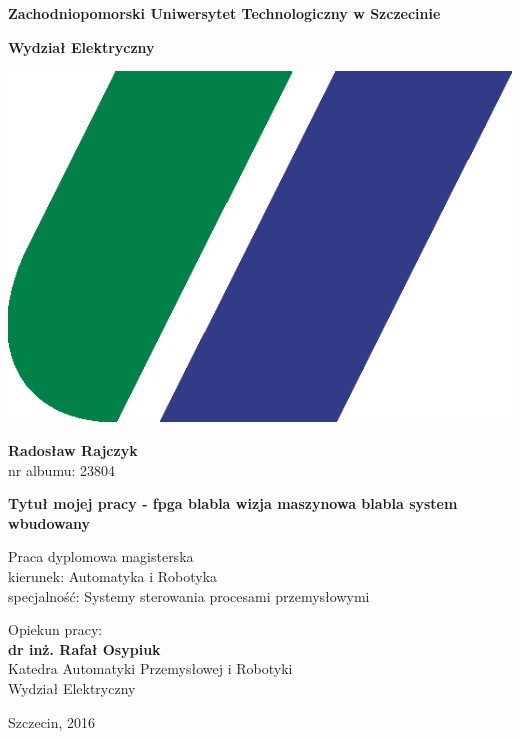 \documentclass[document.tex]{subfiles}
\begin{document}
\begin{center}
\huge{\textbf{Zachodniopomorski Uniwersytet Technologiczny w Szczecinie}}

\LARGE{\textbf{Wydział Elektryczny}}

\vspace{0.5cm}
\includegraphics[scale=0.2]{imgs/logoNew.png}

\vspace{1cm}
\Large{\textbf{Radosław Rajczyk}} \\
\large{nr albumu: 23804}

\vspace{1cm}
\Large{\textbf{Tytuł mojej pracy - fpga blabla wizja maszynowa blabla system wbudowany}}

\vspace{1cm}
\large{Praca dyplomowa magisterska \\
kierunek: Automatyka i Robotyka \\
specjalność: Systemy sterowania procesami przemysłowymi}
\end{center}

\vspace{4cm}
\begin{flushright}
\large{Opiekun pracy:\\
\textbf{dr inż. Rafał Osypiuk} \\
Katedra Automatyki Przemysłowej i Robotyki\\
Wydział Elektryczny}
\end{flushright}

\vspace{2cm}
\begin{center}
\Large{Szczecin, 2016}
\end{center}
\end{document}
